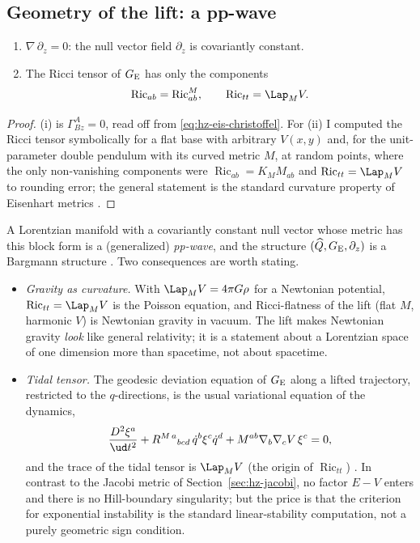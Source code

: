\subsection{Geometry of the lift: a pp-wave}

\begin{proposition}\label{prop:hz-eis-curv}
\leavevmode
\begin{enumerate}[label=(\roman*),nosep]
  \item $\nabla\,\partial_z=0$: the null vector field $\partial_z$ is covariantly constant.
  \item The Ricci tensor of $G_{\rm E}$ has only the components
        \[
          \operatorname{Ric}_{ab}=\operatorname{Ric}^{M}_{ab},\qquad
          \operatorname{Ric}_{tt}=\Lap_MV .
        \]
\end{enumerate}
\end{proposition}

\begin{proof}
(i) is $\Gamma^A_{Bz}=0$, read off from \eqref{eq:hz-eis-christoffel}. For (ii) I computed the Ricci
tensor symbolically for a flat base with arbitrary $V(x,y)$ and, for the
unit-parameter double pendulum with its curved metric $M$, at random points, where the
only non-vanishing components were $\operatorname{Ric}_{ab}=K_MM_{ab}$ and
$\operatorname{Ric}_{tt}=\Lap_MV$ to rounding error; the general statement is the standard curvature
property of Eisenhart metrics \cite{hdp:casetti2000}.
\end{proof}

A Lorentzian manifold with a covariantly constant null vector whose metric has this
block form is a (generalized) \emph{pp-wave}, and the structure
$(\widehat Q,G_{\rm E},\partial_z)$ is a Bargmann structure \cite{hdp:duval1985,hdp:duval1991}.
Two consequences are worth stating.
\begin{itemize}[nosep]
  \item \emph{Gravity as curvature.} With $\Lap_MV=4\pi G\rho$ for a Newtonian
        potential, $\operatorname{Ric}_{tt}=\Lap_MV$ is the Poisson equation, and Ricci-flatness of the lift
        (flat $M$, harmonic $V$) is Newtonian gravity in vacuum. The lift makes Newtonian
        gravity \emph{look} like general relativity; it is a statement about a Lorentzian
        space of one dimension more than spacetime, not about spacetime.
  \item \emph{Tidal tensor.} The geodesic deviation equation of $G_{\rm E}$ along a lifted
        trajectory, restricted to the $q$-directions, is the usual variational equation of the
        dynamics,
        \[
          \frac{D^2\xi^a}{\ud t^2}+R^{M\,a}{}_{bcd}\,\dot q^b\xi^c\dot q^d
          +M^{ab}\nabla_b\nabla_cV\,\xi^c=0,
        \]
        and the trace of the tidal tensor is $\Lap_MV$ (the origin of $\operatorname{Ric}_{tt}$)
        \cite{hdp:casetti2000}. In contrast to the Jacobi metric of
        Section~\ref{sec:hz-jacobi}, no factor $E-V$ enters and there is no Hill-boundary singularity;
        but the price is that the criterion for exponential instability is the standard
        linear-stability computation, not a purely geometric sign condition.
\end{itemize}

